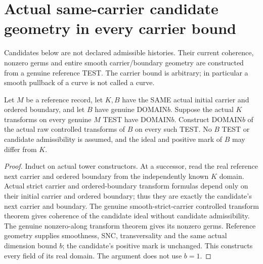 \section{Actual same-carrier candidate geometry in every carrier bound}

Candidates below are not declared admissible histories. Their current
coherence, nonzero germs and entire smooth carrier/boundary geometry are
constructed from a genuine reference TEST. The carrier bound is arbitrary;
in particular a smooth pullback of a curve is not called a curve.

\begin{theorem}
\label{hir:original-arbitrary-bound-same-carrier-candidate-domains}
\leanok
Let $M$ be a reference record, let $K,B$ have the SAME actual initial
carrier and ordered boundary, and let $B$ have genuine DOMAIN$b$.
Suppose the actual $K$ transforms on every genuine $M$ TEST have
DOMAIN$b$. Construct DOMAIN$b$ of the actual raw controlled transforms
of $B$ on every such TEST. No $B$ TEST or candidate admissibility is
assumed, and the ideal and positive mark of $B$ may differ from $K$.
\end{theorem}
\begin{proof}
Induct on actual tower constructors. At a successor, read the real
reference next carrier and ordered boundary from the independently
known $K$ domain. Actual strict carrier and ordered-boundary transform
formulas depend only on their initial carrier and ordered boundary;
thus they are exactly the candidate's next carrier and boundary.
The genuine smooth-strict-carrier controlled transform theorem gives
coherence of the candidate ideal without candidate admissibility.
The genuine nonzero-along transform theorem gives its nonzero germs.
Reference geometry supplies smoothness, SNC, transversality and the
same actual dimension bound $b$; the candidate's positive mark is
unchanged. This constructs every field of its real domain. The
argument does not use $b=1$.
\end{proof}

